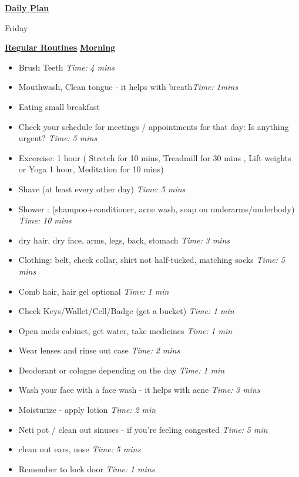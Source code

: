 \documentclass[serif,mathserif,final]{beamer}
\newcommand{\timeEst}[1]{\textit{Time:} \textit{#1}}
\begin{document}
\begin{frame}{}
\begin{columns}[t]
\begin{column}{0.27\linewidth}{\textbf{\underline{Daily Plan}}}
\begin{block} {\small Friday}
\begin{enumerate}
\end{enumerate} 
\end{block}



\begin{block} {\small \textbf{\underline{Regular Routines}} }
\underline{\textbf{Morning}}
\begin{itemize}
\item \tiny Brush Teeth \timeEst{4 mins}
\item \tiny Mouthwash, Clean tongue - it helps with breath\timeEst{1mins} 
\item \tiny Eating small breakfast
\item \tiny Check your schedule for meetings / appointments for that day: Is anything urgent? \timeEst{5 mins}
\item \tiny Excercise: 1 hour ( Stretch for 10 mins, Treadmill for 30 mins , Lift weights or Yoga 1 hour, Meditation for 10 mins)
\item \tiny Shave (at least every other day) \timeEst{5 mins}
\item \tiny Shower : (shampoo+conditioner, acne wash,  soap on underarms/underbody)
\timeEst{10 mins}
\item \tiny dry hair, dry face, arms, legs, back, stomach \timeEst{3 mins}
\item \tiny Clothing: belt, check collar, shirt not half-tucked, matching socks \timeEst{5 mins}
\item \tiny Comb hair, hair gel optional \timeEst{ 1 min}
\item \tiny Check Keys/Wallet/Cell/Badge (get a bucket) \timeEst{1 min}
\item \tiny Open meds cabinet, get water, take medicines \timeEst{1 min}
\item \tiny Wear lenses and rinse out case \timeEst{ 2 mins}
\item \tiny Deodorant or cologne depending on the day \timeEst{1 min}
\item \tiny Wash your face with a face wash - it helps with acne \timeEst{3 mins}
\item \tiny Moisturize - apply lotion \timeEst{ 2 min}
\item \tiny Neti pot / clean out sinuses - if you’re feeling congested \timeEst{5 min}
\item \tiny clean out ears, nose \timeEst{5 mins}
\item \tiny Remember to lock door \timeEst{1 mins}
\end{itemize}


\end{block}
\end{column}
\end{columns}
\end{frame}
\end{document}

